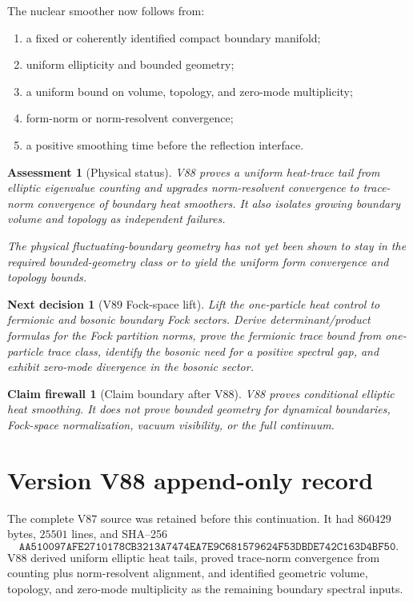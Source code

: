 \documentclass[11pt]{article}
\newtheorem{firewall}[theorem]{Claim firewall}
\newtheorem{decision}[theorem]{Next decision}
\newtheorem{assessment}[theorem]{Assessment}
\theoremstyle{remark}
\begin{document}
The nuclear smoother now follows from:
\begin{enumerate}
\item a fixed or coherently identified compact boundary manifold;
\item uniform ellipticity and bounded geometry;
\item a uniform bound on volume, topology, and zero-mode
      multiplicity;
\item form-norm or norm-resolvent convergence;
\item a positive smoothing time before the reflection interface.
\end{enumerate}

\begin{assessment}[Physical status]
\label{ass:v15v88-status}
V88 proves a uniform heat-trace tail from elliptic eigenvalue
counting and upgrades norm-resolvent convergence to trace-norm
convergence of boundary heat smoothers.  It also isolates growing
boundary volume and topology as independent failures.

The physical fluctuating-boundary geometry has not yet been shown
to stay in the required bounded-geometry class or to yield the
uniform form convergence and topology bounds.
\end{assessment}

\begin{decision}[V89 Fock-space lift]
\label{dec:v15v88-next}
Lift the one-particle heat control to fermionic and bosonic boundary
Fock sectors.  Derive determinant/product formulas for the Fock
partition norms, prove the fermionic trace bound from one-particle
trace class, identify the bosonic need for a positive spectral gap,
and exhibit zero-mode divergence in the bosonic sector.
\end{decision}

\begin{firewall}[Claim boundary after V88]
\label{fire:v15v88}
V88 proves conditional elliptic heat smoothing.  It does not prove
bounded geometry for dynamical boundaries, Fock-space
normalization, vacuum visibility, or the full continuum.
\end{firewall}

\section*{Version V88 append-only record}
The complete V87 source was retained before this continuation.  It
had \(860429\) bytes, \(25501\) lines, and SHA--256
\[
 \texttt{AA510097AFE2710178CB3213A7474EA7E9C681579624F53DBDE742C163D4BF50}.
\]
V88 derived uniform elliptic heat tails, proved trace-norm
convergence from counting plus norm-resolvent alignment, and
identified geometric volume, topology, and zero-mode multiplicity
as the remaining boundary spectral inputs.
\end{document}
